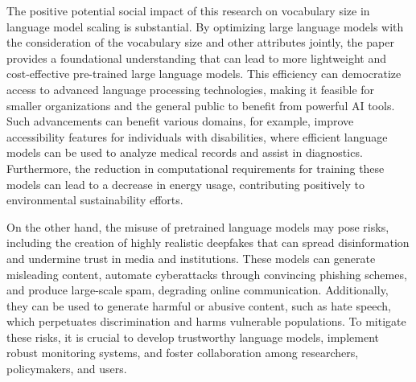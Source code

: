 The positive potential social impact of this research on vocabulary size in language model scaling is substantial. By optimizing large language models with the consideration of the vocabulary size and other attributes jointly, the paper provides a foundational understanding that can lead to more lightweight and cost-effective pre-trained large language models. This efficiency can democratize access to advanced language processing technologies, making it feasible for smaller organizations and the general public to benefit from powerful AI tools. Such advancements can benefit various domains, for example, improve accessibility features for individuals with disabilities, where efficient language models can be used to analyze medical records and assist in diagnostics. Furthermore, the reduction in computational requirements for training these models can lead to a decrease in energy usage, contributing positively to environmental sustainability efforts.

On the other hand, the misuse of pretrained language models may pose risks, including the creation of highly realistic deepfakes that can spread disinformation and undermine trust in media and institutions. These models can generate misleading content, automate cyberattacks through convincing phishing schemes, and produce large-scale spam, degrading online communication. Additionally, they can be used to generate harmful or abusive content, such as hate speech, which perpetuates discrimination and harms vulnerable populations. To mitigate these risks, it is crucial to develop trustworthy language models, implement robust monitoring systems, and foster collaboration among researchers, policymakers, and users.

